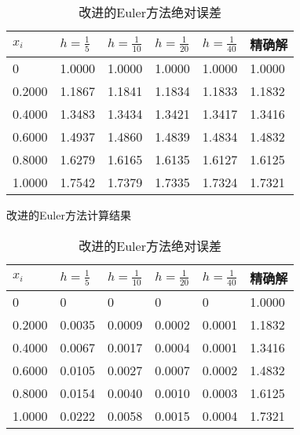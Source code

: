 \documentclass[12pt, a4paper, oneside]{ctexart}
\begin{document}
\begin{table}[h] %
    \centering
    \footnotesize
    \begin{minipage}[t]{0.48\textwidth}\centering
    \begin{tabular}{@{}llllll@{}}
        \toprule
        $x_i$      & $h=\frac{1}{5}$  & $h=\frac{1}{10}$ & $h=\frac{1}{20}$ & $h=\frac{1}{40}$ & 精确解    \\ \midrule 
        0      & 1.0000 & 1.0000 & 1.0000 & 1.0000 & 1.0000 \\
        0.2000 & 1.1867 & 1.1841 & 1.1834 & 1.1833 & 1.1832 \\
        0.4000 & 1.3483 & 1.3434 & 1.3421 & 1.3417 & 1.3416 \\
        0.6000 & 1.4937 & 1.4860 & 1.4839 & 1.4834 & 1.4832 \\
        0.8000 & 1.6279 & 1.6165 & 1.6135 & 1.6127 & 1.6125 \\
        1.0000 & 1.7542 & 1.7379 & 1.7335 & 1.7324 & 1.7321 \\ \bottomrule
        \end{tabular}
	\caption{改进的Euler方法计算结果} \label{fig:euler21}
    \end{minipage}
    \begin{minipage}[t]{0.48\textwidth}\centering
    \begin{tabular}{@{}llllll@{}}
        \toprule
        $x_i$      & $h=\frac{1}{5}$  & $h=\frac{1}{10}$ & $h=\frac{1}{20}$ & $h=\frac{1}{40}$ & 精确解    \\ \midrule 
        0      & 0      & 0      & 0      & 0      & 1.0000 \\
        0.2000 & 0.0035 & 0.0009 & 0.0002 & 0.0001 & 1.1832 \\
        0.4000 & 0.0067 & 0.0017 & 0.0004 & 0.0001 & 1.3416 \\
        0.6000 & 0.0105 & 0.0027 & 0.0007 & 0.0002 & 1.4832 \\
        0.8000 & 0.0154 & 0.0040 & 0.0010 & 0.0003 & 1.6125 \\
        1.0000 & 0.0222 & 0.0058 & 0.0015 & 0.0004 & 1.7321 \\ \bottomrule
        \end{tabular}
	\caption{改进的Euler方法绝对误差} \label{fig:euler22}
    \end{minipage}
\end{table}
\end{document}
